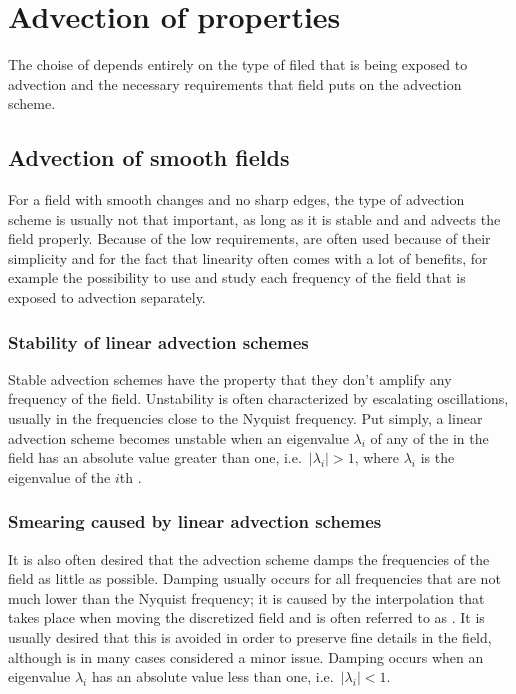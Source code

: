 \chapter{Advection of properties}

The choise of  depends entirely on the type of filed that is being exposed to advection and the necessary requirements that field puts on the advection scheme.

\section{Advection of smooth fields}

For a field with smooth changes and no sharp edges, the type of advection scheme is usually not that important, as long as it is stable and and advects the field properly. Because of the low requirements,  are often used because of their simplicity and for the fact that linearity often comes with a lot of benefits, for example the possibility to use  and study each frequency of the field that is exposed to advection separately.

\subsection{Stability of linear advection schemes}

Stable advection schemes have the property that they don't amplify any frequency of the field. Unstability is often characterized by escalating oscillations, usually in the frequencies close to the Nyquist frequency. Put simply, a linear advection scheme becomes unstable when an eigenvalue $\lambda_i$ of any of the \eigenfunctions in the field has an absolute value greater than one, i.e.\ $|\lambda_i| > 1$, where $\lambda_i$ is the eigenvalue of the $i$th \eigenfunction.

\subsection{Smearing caused by linear advection schemes}

It is also often desired that the advection scheme damps the frequencies of the field as little as possible. Damping usually occurs for all frequencies that are not much lower than the Nyquist frequency; it is caused by the interpolation that takes place when moving the discretized field and is often referred to as \smearing. It is usually desired that this is avoided in order to preserve fine details in the field, although is in many cases considered a minor issue. Damping occurs when an eigenvalue $\lambda_i$ has an absolute value less than one, i.e.\ $|\lambda_i| < 1$.

